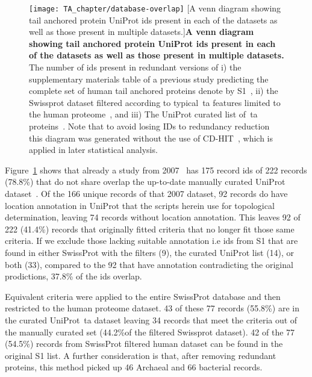 \begin{figure}[!ht]
\centering
\texttt{[image: TA\_chapter/database-overlap]}
		[A venn diagram showing tail anchored protein UniProt ids present in each of the datasets as well as those present in multiple datasets.]{\textbf{A venn diagram showing tail anchored protein UniProt ids present in each of the datasets as well as those present in multiple datasets.}
The number of ids present in redundant versions of
i) the supplementary materials table of a previous study predicting the complete set of human tail anchored proteins denote by S1~\cite{Kalbfleisch2007},
ii) the Swissprot dataset filtered according to typical~\gls{ta} features limited to the human proteome~\cite{TheUniProtConsortium2014}, and
iii) The UniProt curated list of~\gls{ta} proteins~\cite{TheUniProtConsortium2014}.
Note that to avoid losing IDs to redundancy reduction this diagram was generated without the use of CD-HIT~\cite{Huang2010, Wu2011}, which is applied in later statistical analysis.}

\label{fig:tadatasetoverlap}
\end{figure}

Figure~\ref{fig:tadatasetoverlap} shows that already a study from 2007~\cite{Kalbfleisch2007} has 175 record ids of 222 records (78.8\%) that do not share overlap the up-to-date manually curated UniProt dataset~\cite{TheUniProtConsortium2014}.
Of the 166 unique records of that 2007 dataset, 92 records do have location annotation in UniProt that the scripts herein use for topological determination, leaving 74 records without location annotation.
This leaves 92 of 222 (41.4\%) records that originally fitted criteria that no longer fit those same criteria.
If we exclude those lacking suitable annotation i.e ids from S1 that are found in either SwissProt with the filters (9), the curated UniProt list (14), or both (33), compared to the 92 that have annotation contradicting the original prodictions, 37.8\% of the ids overlap.

Equivalent criteria were applied to the entire SwissProt database and then restricted to the human proteome dataset.
43 of these 77 records (55.8\%) are in the curated UniProt~\gls{ta}  dataset leaving 34 records that meet the criteria out of the manually curated set (44.2\%of the filtered Swissprot dataset).
42 of the 77 (54.5\%) records from SwissProt filtered human dataset can be found in the original S1 list.
A further consideration is that, after removing redundant proteins, this method picked up  46 Archaeal and 66 bacterial records.

